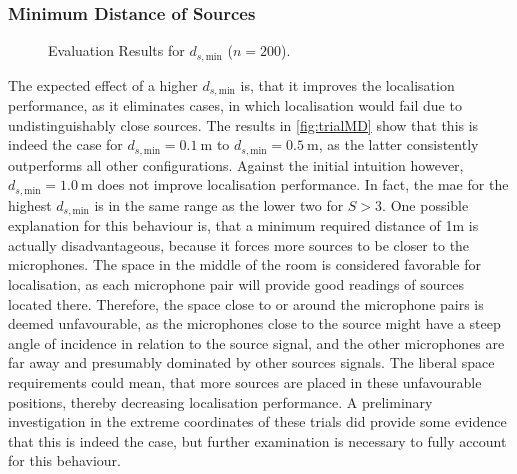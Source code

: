 \subsubsection*{Minimum Distance of Sources}

\begin{figure}[H]
\iftoggle{quick}{%
    \texttt{[image: plots/boxplots/boxplot-joined-md]}
}{%
    
}
	\caption[Evaluation Results for $d_{s,\text{min}}$]{Evaluation Results for $d_{s,\text{min}}$ ($n=200$).}
	\label{fig:trialMD}
\end{figure}
The expected effect of a higher $d_{s,\text{min}}$ is, that it improves the localisation performance, as it eliminates cases, in which localisation would fail due to undistinguishably close sources. The results in \autoref{fig:trialMD} show that this is indeed the case for ${d_{s,\text{min}}=0.1~\text{m}}$ to ${d_{s,\text{min}}=0.5~\text{m}}$, as the latter consistently outperforms all other configurations. Against the initial intuition however, ${d_{s,\text{min}}=1.0~\text{m}}$ does not improve localisation performance. In fact, the \gls{mae} for the highest $d_{s,\text{min}}$ is in the same range as the lower two for $S>3$. One possible explanation for this behaviour is, that a minimum required distance of 1m is actually disadvantageous, because it forces more sources to be closer to the microphones. The space in the middle of the room is considered favorable for localisation, as each microphone pair will provide good readings of sources located there. Therefore, the space close to or around the microphone pairs is deemed unfavourable, as the microphones close to the source might have a steep angle of incidence in relation to the source signal, and the other microphones are far away and presumably dominated by other sources signals. The liberal space requirements could mean, that more sources are placed in these unfavourable positions, thereby decreasing localisation performance. A preliminary investigation in the extreme coordinates of these trials did provide some evidence that this is indeed the case, but further examination is necessary to fully account for this behaviour.